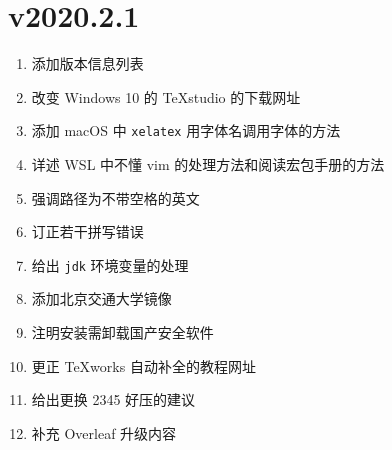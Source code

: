 \section*{v2020.2.1}

\begin{enumerate}
    \item 添加版本信息列表
    \item 改变 Windows 10 的 \TeX studio 的下载网址
    \item 添加 macOS 中 \texttt{xelatex} 用字体名调用字体的方法
    \item 详述 WSL 中不懂 \textsf{vim} 的处理方法和阅读宏包手册的方法
    \item 强调路径为不带空格的英文
    \item 订正若干拼写错误
    \item 给出 \texttt{jdk} 环境变量的处理
    \item 添加北京交通大学镜像
    \item 注明安装需卸载国产安全软件
    \item 更正 \TeX works 自动补全的教程网址
    \item 给出更换 2345 好压的建议
    \item 补充 Overleaf 升级内容
\end{enumerate}